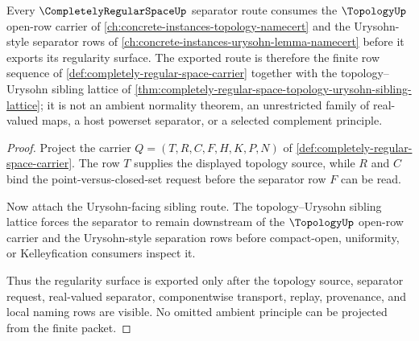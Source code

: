 \begin{theorem}
\label{thm:completely-regular-space-urysohn-link}
Every $\CompletelyRegularSpaceUp$ separator route consumes the $\TopologyUp$ open-row carrier of \autoref{ch:concrete-instances-topology-namecert} and the Urysohn-style separator rows of \autoref{ch:concrete-instances-urysohn-lemma-namecert} before it exports its regularity surface. The exported route is therefore the finite row sequence of \autoref{def:completely-regular-space-carrier} together with the topology--Urysohn sibling lattice of \autoref{thm:completely-regular-space-topology-urysohn-sibling-lattice}; it is not an ambient normality theorem, an unrestricted family of real-valued maps, a host powerset separator, or a selected complement principle.
\end{theorem}

\begin{proof}
Project the carrier $Q=(T,R,C,F,H,K,P,N)$ of \autoref{def:completely-regular-space-carrier}. The row $T$ supplies the displayed topology source, while $R$ and $C$ bind the point-versus-closed-set request before the separator row $F$ can be read.

Now attach the Urysohn-facing sibling route. The topology--Urysohn sibling lattice forces the separator to remain downstream of the $\TopologyUp$ open-row carrier and the Urysohn-style separation rows before compact-open, uniformity, or Kelleyfication consumers inspect it.

Thus the regularity surface is exported only after the topology source, separator request, real-valued separator, componentwise transport, replay, provenance, and local naming rows are visible. No omitted ambient principle can be projected from the finite packet.
\end{proof}
